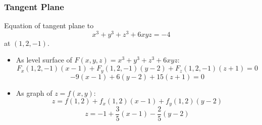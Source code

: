 
\begin{frame}
  \frametitle{Tangent Plane}

  Equation of tangent plane to
  $$x^3+y^3+z^3+6xyz =-4$$
  at $(1,2,-1)$.

  \begin{itemize}
    \item \pause As level surface of $F(x,y,z) = x^3+y^3+z^3+6xyz$:
    $$F_x(1,2,-1) (x-1) + F_y(1,2,-1) (y-2) + F_z(1,2,-1) (z+1) = 0$$
    $$-9(x-1) + 6(y-2) + 15 (z+1) = 0$$

    \item \pause As graph of $z=f(x,y)$:
    $$z = f(1,2) + f_x(1,2) (x-1) + f_y(1,2) (y-2)$$
    $$z = -1 + \frac{3}{5} (x-1) - \frac{2}{5} (y-2)$$
  \end{itemize}
\end{frame}